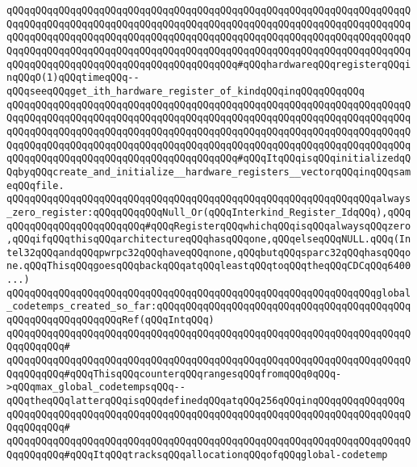 \verb|qQQqqQQqqQQqqQQqqQQqqQQqqQQqqQQqqQQqqQQqqQQqqQQqqQQqqQQqqQQqqQQqqQQqqQQqqQQqqQQqqQQqqQQqqQQqqQQqqQQqqQQqqQQqqQQqqQQqqQQqqQQqqQQqqQQqqQQqqQQqqQQqqQQqqQQqqQQqqQQqqQQqqQQqqQQqqQQqqQQqqQQqqQQqqQQqqQQqqQQqqQQqqQQqqQQqqQQqqQQqqQQqqQQqqQQqqQQqqQQqqQQqqQQqqQQqqQQqqQQqqQQqqQQqqQQqqQQqqQQqqQQqqQQqqQQqqQQqqQQqqQQqqQQqqQQqqQQqqQQq#qQQqhardwareqQQqregisterqQQqinqQQqO(1)qQQqtimeqQQq--qQQqseeqQQqget_ith_hardware_register_of_kindqQQqinqQQqqQQqqQQq|\newline
\verb|qQQqqQQqqQQqqQQqqQQqqQQqqQQqqQQqqQQqqQQqqQQqqQQqqQQqqQQqqQQqqQQqqQQqqQQqqQQqqQQqqQQqqQQqqQQqqQQqqQQqqQQqqQQqqQQqqQQqqQQqqQQqqQQqqQQqqQQqqQQqqQQqqQQqqQQqqQQqqQQqqQQqqQQqqQQqqQQqqQQqqQQqqQQqqQQqqQQqqQQqqQQqqQQqqQQqqQQqqQQqqQQqqQQqqQQqqQQqqQQqqQQqqQQqqQQqqQQqqQQqqQQqqQQqqQQqqQQqqQQqqQQqqQQqqQQqqQQqqQQqqQQqqQQqqQQqqQQqqQQq#qQQqItqQQqisqQQqinitializedqQQqbyqQQqcreate_and_initialize__hardware_registers__vectorqQQqinqQQqsameqQQqfile.|\newline
\newline
\verb|qQQqqQQqqQQqqQQqqQQqqQQqqQQqqQQqqQQqqQQqqQQqqQQqqQQqqQQqqQQqqQQqalways_zero_register:qQQqqQQqqQQqNull_Or(qQQqInterkind_Register_IdqQQq),qQQqqQQqqQQqqQQqqQQqqQQqqQQq#qQQqRegisterqQQqwhichqQQqisqQQqalwaysqQQqzero,qQQqifqQQqthisqQQqarchitectureqQQqhasqQQqone,qQQqelseqQQqNULL.qQQq(Intel32qQQqandqQQqpwrpc32qQQqhaveqQQqnone,qQQqbutqQQqsparc32qQQqhasqQQqone.qQQqThisqQQqgoesqQQqbackqQQqatqQQqleastqQQqtoqQQqtheqQQqCDCqQQq6400...)|\newline
\newline
\verb|qQQqqQQqqQQqqQQqqQQqqQQqqQQqqQQqqQQqqQQqqQQqqQQqqQQqqQQqqQQqqQQqglobal_codetemps_created_so_far:qQQqqQQqqQQqqQQqqQQqqQQqqQQqqQQqqQQqqQQqqQQqqQQqqQQqqQQqqQQqqQQqRef(qQQqIntqQQq)|\newline
\verb|qQQqqQQqqQQqqQQqqQQqqQQqqQQqqQQqqQQqqQQqqQQqqQQqqQQqqQQqqQQqqQQqqQQqqQQqqQQqqQQq#|\newline
\verb|qQQqqQQqqQQqqQQqqQQqqQQqqQQqqQQqqQQqqQQqqQQqqQQqqQQqqQQqqQQqqQQqqQQqqQQqqQQqqQQq#qQQqThisqQQqcounterqQQqrangesqQQqfromqQQq0qQQq->qQQqmax_global_codetempsqQQq--qQQqtheqQQqlatterqQQqisqQQqdefinedqQQqatqQQq256qQQqinqQQqqQQqqQQqqQQq|\newline
\verb|qQQqqQQqqQQqqQQqqQQqqQQqqQQqqQQqqQQqqQQqqQQqqQQqqQQqqQQqqQQqqQQqqQQqqQQqqQQqqQQq#|\newline
\verb|qQQqqQQqqQQqqQQqqQQqqQQqqQQqqQQqqQQqqQQqqQQqqQQqqQQqqQQqqQQqqQQqqQQqqQQqqQQqqQQq#qQQqItqQQqtracksqQQqallocationqQQqofqQQqglobal-codetemp|\newline
